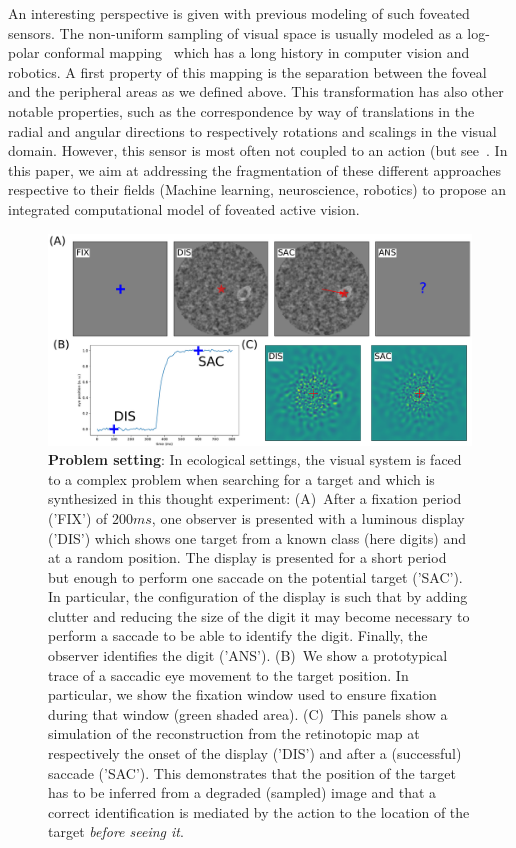 An interesting perspective is given with previous modeling of such foveated sensors. The non-uniform sampling of visual space is usually modeled as a log-polar conformal mapping~\citep{Traver10} which has a long history in computer vision and robotics. A first property of this mapping is the separation between the foveal and the peripheral areas as we defined above. This transformation has also other notable properties, such as the correspondence by way of translations in the radial and angular directions to respectively rotations and scalings in the visual domain. However, this sensor is most often not coupled to an action (but see~\citep{ref needed)}. In this paper, we aim at addressing the fragmentation of these different approaches respective to their fields (Machine learning, neuroscience, robotics) to propose an integrated computational model of foveated active vision.
\fi
\begin{figure}%
\includegraphics[width=\linewidth]{fig_intro}
\caption{
{\bf Problem setting}: In ecological settings, the visual system is faced to a complex problem when searching for a target and which is synthesized in this thought experiment:
(A)~After a fixation period ('FIX') of $200 ms$, one observer is presented with a luminous display ('DIS') which shows one target from a known class (here digits) and at a random position. The display is presented for a short period but enough to perform one saccade on the potential target ('SAC'). In particular, the configuration of the display is such that by adding clutter and reducing the size of the digit it may become necessary to perform a saccade to be able to identify the digit. Finally, the observer identifies the digit ('ANS').
(B)~We show a prototypical trace of a saccadic eye movement to the target position. In particular, we show the fixation window used to ensure fixation during that window (green shaded area). (C)~This panels show a simulation of the reconstruction from the retinotopic map at respectively the onset of the display ('DIS') and after a (successful) saccade ('SAC'). This demonstrates that the position of the target has to be inferred from a degraded (sampled) image and that a correct identification is mediated by the action to the location of the target \emph{before seeing it}.
\label{fig:intro}}%
\end{figure}%
\CNS

